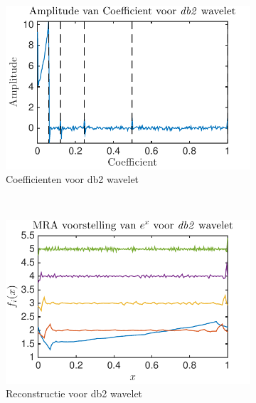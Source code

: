 \begin{figure}
\begin{subfigure}[b]{0.4\textwidth}
        \includegraphics[width=\textwidth]{../src/denoising/db2_Noise/coef_exp_db2_4_noise_10}
        \caption{Coefficienten voor db2 wavelet}
        \label{fig:tiger}
    \end{subfigure}
    ~ %
    \begin{subfigure}[b]{0.4\textwidth}
        \includegraphics[width=\textwidth]{../src/denoising/db2_Noise/MRA_exp_db2_4_noise_10}
        \caption{Reconstructie voor db2 wavelet}
        \label{fig:mouse}
    \end{subfigure}
    \begin{subfigure}[b]{0.4\textwidth}

\end{subfigure}
\end{figure}
